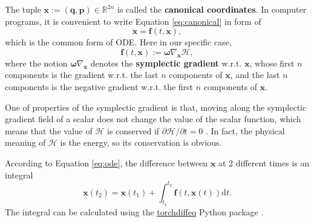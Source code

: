 \documentclass{article}
\begin{document}
The tuple $\mathbf x:=\left(\mathbf q,\mathbf p\right)\in\mathbb R^{2n}$
is called the \textbf{canonical coordinates}.
In computer programs, it is convenient to write Equation \ref{eq:canonical}
in form of
\begin{equation}
	\dot{\mathbf x}=\mathbf f\left(t,\mathbf x\right),
\end{equation}
which is the common form of ODE.
Here in our specific case,
\begin{equation}
	\mathbf f\left(t,\mathbf x\right):=\boldsymbol\omega\nabla_{\mathbf x}\mathcal H,
	\label{eq:ode}
\end{equation}
where the notion $\boldsymbol\omega\nabla_{\mathbf x}$ denotes the \textbf{symplectic gradient} w.r.t. $\mathbf x$,
whose first $n$ components is the gradient w.r.t. the last $n$ components of $\mathbf x$,
and the last $n$ components is the negative gradient w.r.t. the first $n$ components of $\mathbf x$.

One of properties of the symplectic gradient is that,
moving along the symplectic gradient field of a scalar does not change the value of the scalar function,
which means that the value of $\mathcal H$ is conserved if $\partial\mathcal H/\partial t=0$ \cite[p. 67]{arnold1989mathmech}\cite[p. 132]{landau1976mechanics}.
In fact, the physical meaning of $\mathcal H$ is the energy,
so its conservation is obvious.

According to Equation \ref{eq:ode}, the difference between $\mathbf x$ at 2 different times is an integral
\begin{equation}
	\mathbf x\left(t_2\right)=\mathbf x\left(t_1\right)+\int_{t_1}^{t_2}\mathbf f\left(t,\mathbf x\left(t\right)\right)\mathrm dt.
	\label{eq:int}
\end{equation}
The integral can be calculated using the \href{https://github.com/rtqichen/torchdiffeq}{torchdiffeq} Python package \cite{chen2018ode}.
\end{document}
